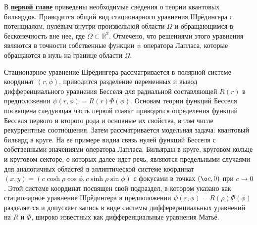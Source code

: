 В \underline{\textbf{первой главе}} приведены необходимые сведения о теории квантовых бильярдов. 
Приводится общий вид стационарного уравнения Шрёдингера с потенциалом, нулевым внутри произвольной области $\Omega$ и обращающимся в бесконечность вне нее, где $\Omega \subset \mathbb{R}^2$. Отмечено, что решениями этого уравнения являются в точности собственные функции $\psi$ оператора Лапласа, которые обращаются в нуль на границе  области  $\Omega$.

Стационарное уравнение Шрёдингера рассматривается в полярной системе координат $(r, \phi)$, приводится разделение переменных и вывод дифференциального уравнения Бесселя для радиальной составляющей $R(r)$ в предположении $\psi(r,\phi) = R(r)\Phi(\phi)$. 
Основам теории функций Бесселя посвящена следующая часть первой главы: приводятся определения функций Бесселя первого и второго рода и основные их свойства, в том числе рекуррентные соотношения.
Затем рассматривается модельная задача: квантовый бильярд в круге. На ее примере видна связь нулей функций Бесселя с собственными значениями оператора Лапласа. Бильярды в круге, круговом кольце и круговом секторе, о которых далее идет речь, являются предельными случаями для аналогичных областей в эллиптической системе координат $(x,y)=(c \cosh \rho \cos \phi, c \sinh \rho \sin \phi)$ с фокусами в точках $(\o c,0)$ при $c \to 0$.
Этой системе координат посвящен свой подраздел, в котором указано как стационарное уравнение Шрёдингера в предположении $\psi(r,\phi) = R(\rho)\Phi(\phi)$ разделяется и допускает запись в виде системы дифферернциальных уравнений на $R$ и $\Phi$, широко известных как дифференциальные уравнения Матьё.

